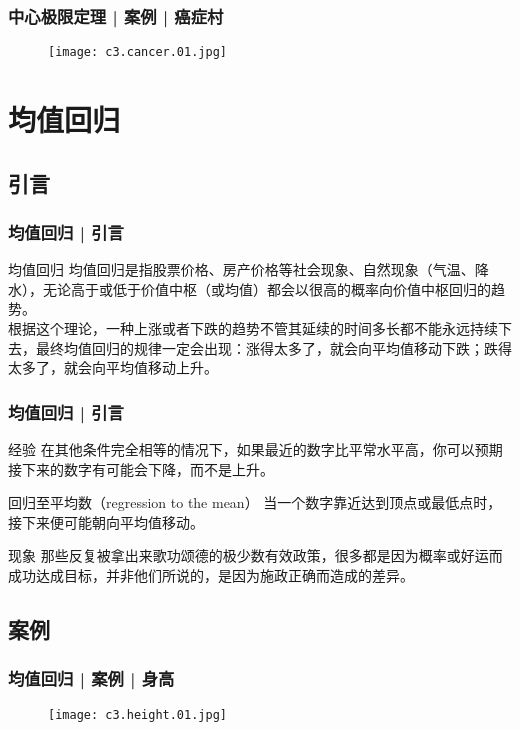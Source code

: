 \begin{frame}
  \frametitle{中心极限定理 | 案例 | 癌症村}
  \begin{figure}
    \centering
    \texttt{[image: c3.cancer.01.jpg]}
  \end{figure}
\end{frame}

\section{均值回归}
\subsection{引言}
\begin{frame}
  \frametitle{均值回归 | 引言}
  \begin{block}{均值回归}
    均值回归是指股票价格、房产价格等社会现象、自然现象（气温、降水），无论高于或低于价值中枢（或均值）都会以很高的概率向价值中枢回归的趋势。\\
    \vspace{1em}
根据这个理论，一种上涨或者下跌的趋势不管其延续的时间多长都不能永远持续下去，最终均值回归的规律一定会出现：涨得太多了，就会向平均值移动下跌；跌得太多了，就会向平均值移动上升。
  \end{block}
\end{frame}

\begin{frame}
  \frametitle{均值回归 | 引言}
  \begin{block}{经验}
    在其他条件完全相等的情况下，如果最近的数字比平常水平高，你可以预期接下来的数字有可能会下降，而不是上升。
  \end{block}
  \pause
  \begin{block}{回归至平均数（regression to the mean）}
    当一个数字靠近达到顶点或最低点时，接下来便可能朝向平均值移动。
  \end{block}
  \pause
  \begin{block}{现象}
    那些反复被拿出来歌功颂德的极少数有效政策，很多都是因为概率或好运而成功达成目标，并非他们所说的，是因为施政正确而造成的差异。
  \end{block}
\end{frame}

\subsection{案例}
\begin{frame}
  \frametitle{均值回归 | 案例 | 身高}
  \begin{figure}
    \centering
    \texttt{[image: c3.height.01.jpg]}
  \end{figure}
\end{frame}

